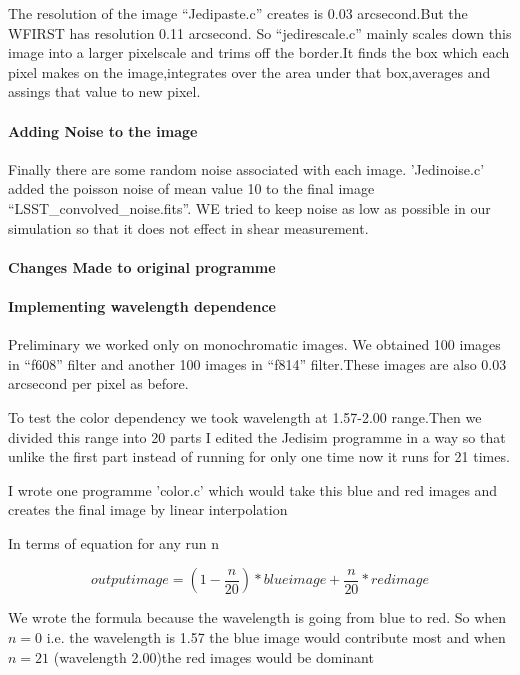 The resolution of the image ``Jedipaste.c''  creates is 0.03 arcsecond.But the WFIRST has resolution 0.11 arcsecond. So ``jedirescale.c'' mainly scales
down this image into a larger pixelscale and trims off the border.It finds the box which each pixel makes on the image,integrates over the area
under that box,averages  and assings that value to new pixel.

\paragraph{Adding Noise to the image}


 Finally there are some random noise associated with each image. 'Jedinoise.c' added the poisson noise of mean value 10 to the final
image ``LSST\_convolved\_noise.fits''. WE tried to keep noise as low as possible in our simulation so that it does not effect in shear measurement.

\paragraph{Changes Made to original programme}

\paragraph{Implementing wavelength dependence}
   Preliminary we worked only on monochromatic images. We obtained 100 images in ``f608'' filter and another 100 images in ``f814'' filter.These
images are also 0.03 arcsecond per pixel as before.

  To test the color dependency we took wavelength at 1.57-2.00 range.Then we divided this range into 20 parts
 I edited the Jedisim programme in a way so that unlike the first part instead of running for only one time now it runs for 21 times.

  I  wrote one programme 'color.c' which would take this blue and red images and creates the final image by linear interpolation


In terms of equation for any run n

\begin{equation}
  output image = (1-\frac{n}{20})* blue image + \frac{n}{20}*red image
\end{equation}

We wrote the formula because the wavelength is going from blue to red. So when $n=0$ i.e. the wavelength is 1.57 the blue image would contribute most and when $n=21$
(wavelength 2.00)the red images would be dominant

